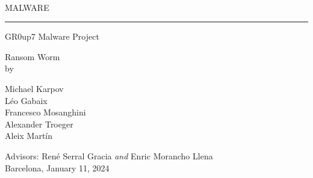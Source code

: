 
\thispagestyle{empty}

\begin{center}

{\sffamily  
    \\
    \vspace{2cm}

    {\Huge MALWARE}\\
    \vspace{0.5cm}

    {\color{black}\hrule height 1pt}
    \vspace{1cm}

    {\LARGE{GR0up7 Malware Project\\}
    \vspace{0.5cm}
    \large{
    Ransom Worm\\
    \vspace{0.25cm}
    by\\
    \vspace{0.5cm}
    
    
    Michael Karpov\\
    Léo Gabaix\\
    Francesco Mosanghini\\
    Alexander Troeger\\
    Aleix Martín}}
    \vspace{1.5cm}


    {{Advisors: René Serral Gracia \textit{and} Enric Morancho Llena\\}}
    {{Barcelona, January 11, 2024}}

    \thispagestyle{alim}
}

\end{center}

\newpage
